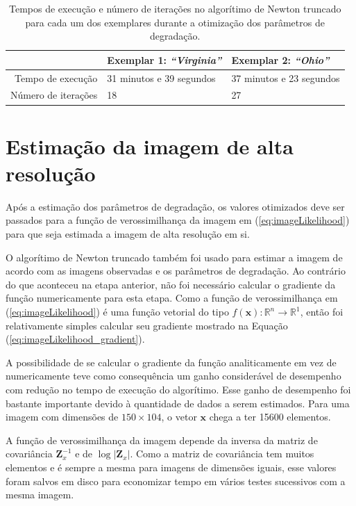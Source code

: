 \begin{table}[H]
	\caption{Tempos de execução e número de iterações no algorítimo de Newton truncado para cada um dos exemplares durante a otimização dos parâmetros de degradação.}
	\label{tab:temposexec}
	\begin{tabular}{r || l | l}
		 & Exemplar 1: \emph{``Virginia''} & Exemplar 2: \emph{``Ohio''} \\ \hline
		Tempo de execução & 31 minutos e 39 segundos & 37 minutos e 23 segundos \\ \hline
		Número de iterações & 18 & 27
	\end{tabular}
\end{table}

\clearpage
\section{Estimação da imagem de alta resolução}
\label{sec:imgestimation}
Após a estimação dos parâmetros de degradação, os valores otimizados deve ser passados para a função de verossimilhança da imagem em (\ref{eq:imageLikelihood}) para que seja estimada a imagem de alta resolução em si.

O algorítimo de Newton truncado também foi usado para estimar a imagem de acordo com as imagens observadas e os parâmetros de degradação.
Ao contrário do que aconteceu na etapa anterior, não foi necessário calcular o gradiente da função numericamente para esta etapa.
Como a função de verossimilhança em (\ref{eq:imageLikelihood}) é uma função vetorial do tipo $ f(\mathbf{x}) : \mathbb{R}^n \to \mathbb{R}^1$, então foi relativamente simples calcular seu gradiente mostrado na Equação (\ref{eq:imageLikelihood_gradient}).

A possibilidade de se calcular o gradiente da função analiticamente em vez de numericamente teve como consequência um ganho considerável de desempenho com redução no tempo de execução do algorítimo.
Esse ganho de desempenho foi bastante importante devido à quantidade de dados a serem estimados.
Para uma imagem com dimensões de $150 \times 104$, o vetor $\mathbf{x}$ chega a ter 15600 elementos.

A função de verossimilhança da imagem depende da inversa da matriz de covariância $\mathbf{Z}_x^{-1}$ e de $\log{|\mathbf{Z}_x|}$.
Como a matriz de covariância tem muitos elementos e é sempre a mesma para imagens de dimensões iguais, esse valores foram salvos em disco para economizar tempo em vários testes sucessivos com a mesma imagem.

